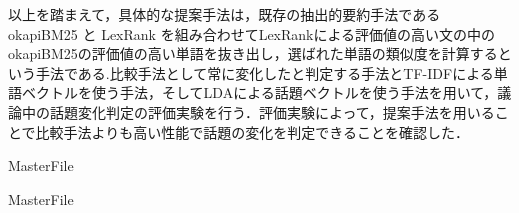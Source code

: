 以上を踏まえて，具体的な提案手法は，既存の抽出的要約手法である okapiBM25 と LexRank を組み合わせてLexRankによる評価値の高い文の中のokapiBM25の評価値の高い単語を抜き出し，選ばれた単語の類似度を計算するという手法である.比較手法として常に変化したと判定する手法とTF-IDFによる単語ベクトルを使う手法，そしてLDAによる話題ベクトルを使う手法を用いて，議論中の話題変化判定の評価実験を行う．評価実験によって，提案手法を用いることで比較手法よりも高い性能で話題の変化を判定できることを確認した．

 \expandafter\ifx\csname MasterFile\endcsname\relax
	\def\BibFile{hoge}
	
  \fi
  \expandafter\ifx\csname MasterFile\endcsname\relax

\fi
